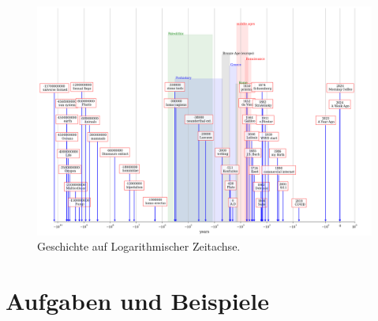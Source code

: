 \newpage
\begin{figure}[h!]
    \centering
    \includegraphics[height=\textwidth, angle=90]{img/time_log.png}
    \caption{Geschichte auf Logarithmischer Zeitachse.}
    \label{fig:time_log}
\end{figure}





\section{Aufgaben und Beispiele}

